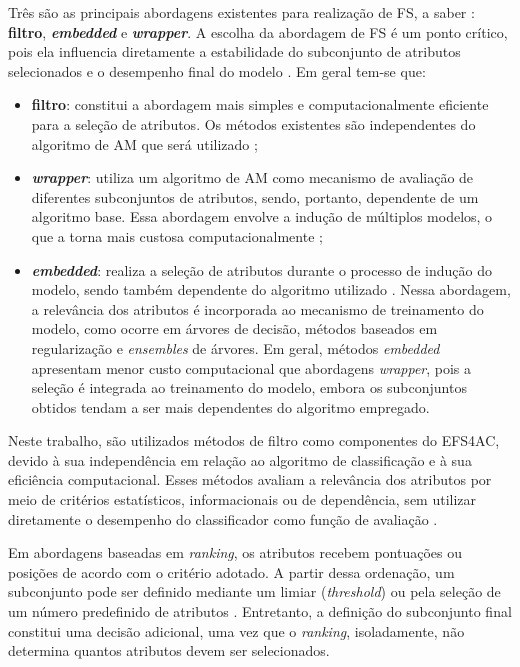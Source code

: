 Três são as principais abordagens existentes para realização de FS, a saber \cite{Tan2020,Theng2024}: \textbf{filtro}, \textbf{\textit{embedded}} e \textbf{\textit{wrapper}}. A escolha da abordagem de FS é um ponto crítico, pois ela influencia diretamente a estabilidade do subconjunto de atributos selecionados e o desempenho final do modelo \cite{KHAIRE20221060,BARBIERI2024123667}. Em geral tem-se que:
\begin{itemize}
    \item \textbf{filtro}: constitui a abordagem mais simples e computacionalmente eficiente para a seleção de atributos. Os métodos existentes são independentes do algoritmo de AM que será utilizado \cite{Dhal2022,10.1007/978-3-031-23092-9_12,Theng2024,EBRAHIMIWARKIANI2025129372};
    
    \item \textbf{\textit{wrapper}}: utiliza um algoritmo de AM como mecanismo de avaliação de diferentes subconjuntos de atributos, sendo, portanto, dependente de um algoritmo base. Essa abordagem envolve a indução de múltiplos modelos, o que a torna mais custosa computacionalmente \cite{Theng2024};
    
    \item \textbf{\textit{embedded}}: realiza a seleção de atributos durante o processo de indução do modelo, sendo também dependente do algoritmo utilizado \cite{bashir2022novel,Theng2024}. Nessa abordagem, a relevância dos atributos é incorporada ao mecanismo de treinamento do modelo, como ocorre em árvores de decisão, métodos baseados em regularização e \textit{ensembles} de árvores. Em geral, métodos \textit{embedded} apresentam menor custo computacional que abordagens \textit{wrapper}, pois a seleção é integrada ao treinamento do modelo, embora os subconjuntos obtidos tendam a ser mais dependentes do algoritmo empregado.
\end{itemize}

Neste trabalho, são utilizados métodos de filtro como componentes do EFS4AC, devido à sua independência em relação ao algoritmo de classificação e à sua eficiência computacional. Esses métodos avaliam a relevância dos atributos por meio de critérios estatísticos, informacionais ou de dependência, sem utilizar diretamente o desempenho do classificador como função de avaliação \cite{SolorioFernandez2020,Bouchlaghem2022,Theng2024}.

Em abordagens baseadas em \textit{ranking}, os atributos recebem pontuações ou posições de acordo com o critério adotado. A partir dessa ordenação, um subconjunto pode ser definido mediante um limiar (\textit{threshold}) ou pela seleção de um número predefinido de atributos \cite{geng2007feature,jovic2015review,Theng2024}. Entretanto, a definição do subconjunto final constitui uma decisão adicional, uma vez que o \textit{ranking}, isoladamente, não determina quantos atributos devem ser selecionados.

